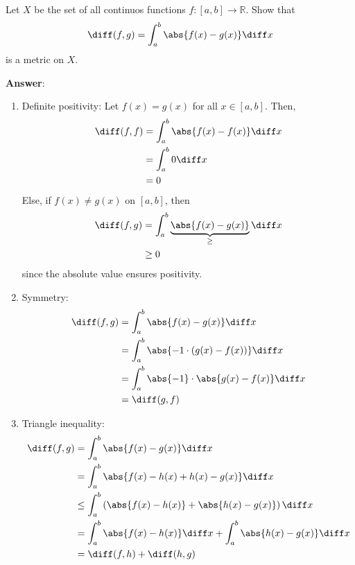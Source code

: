 \begin{exm}
	Let $X$ be the set of all continuos functions $f:[a,b]\to\mathbb{R}$. Show that
	\begin{equation*}
		\diff(f,g)=\int_a^b \abs{f(x)-g(x)}\diff x
	\end{equation*}
	is a metric on $X$.
	\begin{flushleft}
		\textbf{Answer}:
		\begin{enumerate}
			\item Definite positivity: Let $f(x)=g(x)$ for all $x\in[a,b]$. Then,
			      \begin{align*}
				      \diff(f,f) & = \int_a^b \abs{f(x)-f(x)}\diff x \\
				                 & = \int_a^b 0 \diff x              \\
				                 & = 0
			      \end{align*}
			      Else, if $f(x)\neq g(x)$ on $[a,b]$, then
			      \begin{align*}
				      \diff(f,g) & = \int_a^b \underbrace{\abs{f(x)-g(x)}}_{\geq}\diff x \\
				                 & \geq 0
			      \end{align*}
			      since the absolute value ensures positivity.
			\item Symmetry:
			      \begin{align*}
				      \diff(f,g) & = \int_a^b \abs{f(x)-g(x)}\diff x              \\
				                 & = \int_a^b \abs{-1\cdot(g(x)-f(x))}\diff x     \\
				                 & = \int_a^b \abs{-1}\cdot\abs{g(x)-f(x)}\diff x \\
				                 & = \diff(g,f)
			      \end{align*}
			\item Triangle inequality:
			      \begin{align*}
				      \diff(f,g) & = \int_a^b \abs{f(x)-g(x)}\diff x                                     \\
				                 & = \int_a^b \abs{f(x)-h(x)+h(x)-g(x)}\diff x                           \\
				                 & \leq \int_a^b \left(\abs{f(x)-h(x)}+\abs{h(x)-g(x)}\right)\diff x     \\
				                 & = \int_a^b \abs{f(x)-h(x)} \diff x + \int_a^b \abs{h(x)-g(x)} \diff x \\
				                 & = \diff(f,h) + \diff(h,g)
			      \end{align*}
		\end{enumerate}
	\end{flushleft}
\end{exm}

